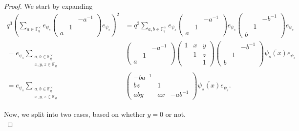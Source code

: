 \documentclass[12pt,reqno]{amsart}
\theoremstyle{definition}
\theoremstyle{remark}
\numberwithin{equation}{section}
\def\IM#1{\textcolor[rgb]{0.00,0.00,0.75}{[I: #1]}}
\begin{document}
    \begin{proof} We start by expanding
    \begin{align*}
        q^3\left(\sum_{a \in \mathbb{F}_q^\times} e_{\psi_s} \begin{pmatrix}
        & & -a^{-1}\\
        & 1 &\\
        a & &
    \end{pmatrix} e_{\psi_s}\right)^2 &= q^3\sum_{a, b \in \mathbb{F}_q^\times} e_{\psi_s}\begin{pmatrix}
        & & -a^{-1}\\
        & 1 &\\
        a & &
    \end{pmatrix}e_{\psi_s}\begin{pmatrix}
        & & -b^{-1}\\
        & 1 &\\
        b & &
    \end{pmatrix}e_{\psi_s}\\
    = e_{\psi_s}\sum_{\substack{a, b \in \mathbb{F}_q^\times\\x, y, z \in \mathbb{F}_q}}&\begin{pmatrix}
        & & -a^{-1}\\
        & 1 &\\
        a & &
    \end{pmatrix} \begin{pmatrix}
        1 & x & y\\
        & 1 & z\\
        & & 1
    \end{pmatrix}\begin{pmatrix}
        & & -b^{-1}\\
        & 1 &\\
        b & &
    \end{pmatrix} \overline{\psi_s(x)} e_{\psi_s}\\
    = e_{\psi_s}\sum_{\substack{a, b \in \mathbb{F}_q^\times\\x, y, z \in \mathbb{F}_q}}&\begin{pmatrix}
        -ba^{-1} & &\\
        bz & 1 & \\
        aby & ax & -ab^{-1}
    \end{pmatrix} \overline{\psi_s(x)} e_{\psi_s}.
    \end{align*}

    Now, we split into two cases, based on whether $y = 0$ or not.\\ %


\end{proof}
\end{document}
